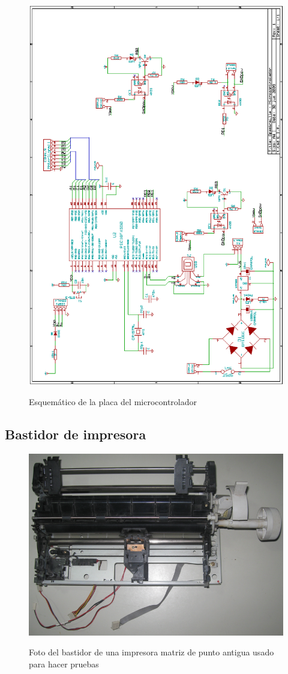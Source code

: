 \begin{figure}[hp]
  \centering
  \includegraphics[width=\textwidth,height=\textheight]{./img/pic_board.png}
  \label{cap:pic_board}
  \caption{Esquem\'atico de la placa del microcontrolador}
\end{figure}
\clearpage

\newpage
\subsection{Bastidor de impresora}
\begin{figure}[htp]
  \centering
  \includegraphics[width=14cm]{./img/fotos/printer_skeleton.png}
  \label{fig:printer_skeleton}
  \caption{Foto del bastidor de una impresora matriz de punto antigua usado
para hacer pruebas}
\end{figure}